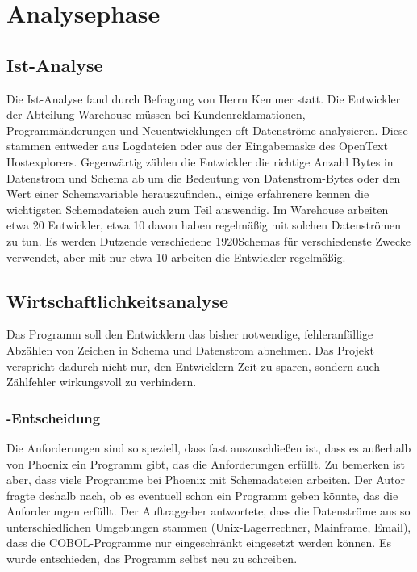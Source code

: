 \section{Analysephase} 
\label{sec:Analysephase}

\subsection{Ist-Analyse} 
\label{sec:IstAnalyse}
Die Ist-Analyse fand durch Befragung von Herrn Kemmer statt. 
Die Entwickler der Abteilung Warehouse müssen bei Kundenreklamationen, Programmänderungen und Neuentwicklungen oft Datenströme analysieren. Diese stammen entweder aus Logdateien oder aus der Eingabemaske des OpenText Hostexplorers. Gegenwärtig zählen die Entwickler die richtige Anzahl Bytes in Datenstrom und Schema ab um die Bedeutung von Datenstrom-Bytes oder den Wert einer Schemavariable herauszufinden., einige erfahrenere kennen die wichtigsten Schemadateien auch zum Teil auswendig.
Im Warehouse arbeiten etwa 20 Entwickler, etwa 10 davon haben regelmäßig mit solchen Datenströmen zu tun. Es werden Dutzende verschiedene 1920Schemas für verschiedenste Zwecke verwendet, aber mit nur etwa 10 arbeiten die Entwickler regelmäßig.


\subsection{Wirtschaftlichkeitsanalyse}
\label{sec:Wirtschaftlichkeitsanalyse}
Das Programm soll den Entwicklern das bisher notwendige, fehleranfällige Abzählen von Zeichen in Schema und Datenstrom abnehmen. Das Projekt verspricht dadurch nicht nur, den Entwicklern Zeit zu sparen, sondern auch Zählfehler wirkungsvoll zu verhindern.

\subsubsection{-Entscheidung}
\label{sec:MakeOrBuyEntscheidung}
Die Anforderungen sind so speziell, dass fast auszuschließen ist, dass es außerhalb von Phoenix ein Programm gibt, das die Anforderungen erfüllt. Zu bemerken ist aber, dass viele Programme bei Phoenix mit Schemadateien arbeiten. Der Autor fragte deshalb nach, ob es eventuell schon ein Programm geben könnte, das die Anforderungen erfüllt. Der Auftraggeber antwortete, dass die Datenströme aus so unterschiedlichen Umgebungen stammen (Unix-Lagerrechner, Mainframe, Email), dass die COBOL-Programme nur eingeschränkt eingesetzt werden können. Es wurde entschieden, das Programm selbst neu zu schreiben.

